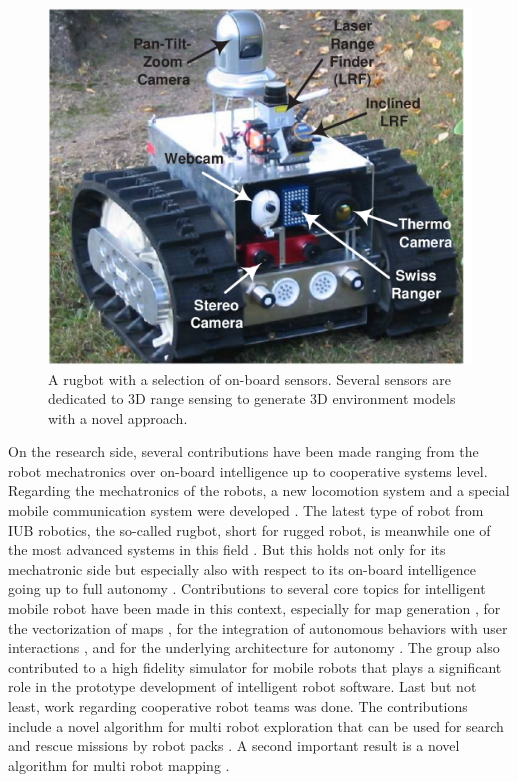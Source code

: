 \begin{figure}[thpb]
  \centering
  \includegraphics[width=\linewidth]{autonomousrobot.pdf}
  \caption{A {rugbot} with a selection of on-board sensors. Several sensors are dedicated
    to 3D range sensing to generate 3D environment models with a novel approach.}
  \label{fig:rugbot}
\end{figure}




On the research side, several contributions have been made ranging from the robot
mechatronics over on-board intelligence up to cooperative systems level.  Regarding the
mechatronics of the robots, a new locomotion system \cite{birk_flipper_rcup06} and a
special mobile communication system were developed \cite{birk_rescuecabledrum_rcup05}. The
latest type of robot from IUB robotics, the so-called rugbot, short for rugged robot, is
meanwhile one of the most advanced systems in this field \cite{birk_rugbot_ssrr06}. But
this holds not only for its mechatronic side but especially also with respect to its
on-board intelligence going up to full autonomy
\cite{birk_rescueteam_rcup05}. Contributions to several core topics for intelligent mobile
robot have been made in this context, especially for map generation
\cite{birkRescRobARJ06}, for the vectorization of maps
\cite{birk_mapvectorization_rcup06}, for the integration of autonomous behaviors with user
interactions \cite{birk_rescueGUI_rcup05}, and for the underlying architecture for
autonomy \cite{birk_autonomy_ssrr06}. The group also contributed to a high fidelity
simulator for mobile robots \cite{birk_virtualrobot_rcup05} that plays a significant role
in the prototype development of intelligent robot software.  Last but not least, work
regarding cooperative robot teams was done. The contributions include a novel algorithm
for multi robot exploration \cite{birk_CommExpore_CEP06} that can be used for search and
rescue missions by robot packs \cite{birk_commexplore_rcup05}. A second important result
is a novel algorithm for multi robot mapping \cite{BirkMultiMap_IEEEproc}.


